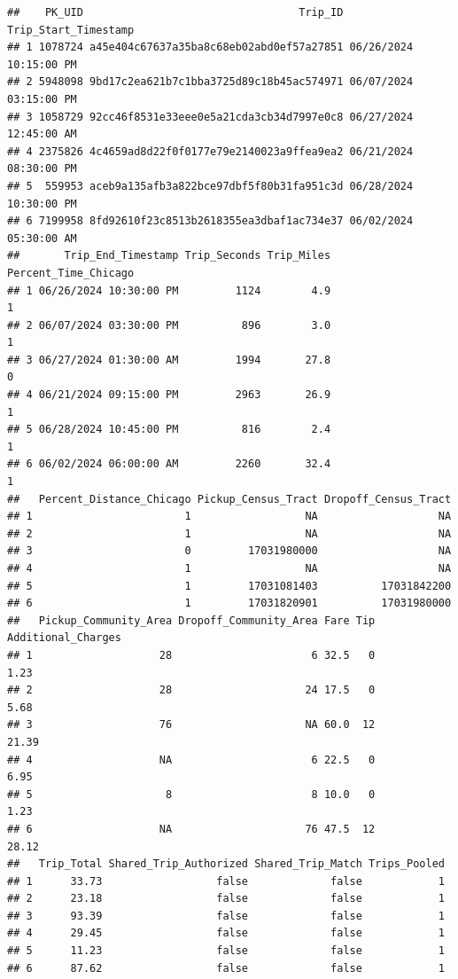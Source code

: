 \documentclass[
]{article}
\begin{document}
\begin{verbatim}
##    PK_UID                                  Trip_ID   Trip_Start_Timestamp
## 1 1078724 a45e404c67637a35ba8c68eb02abd0ef57a27851 06/26/2024 10:15:00 PM
## 2 5948098 9bd17c2ea621b7c1bba3725d89c18b45ac574971 06/07/2024 03:15:00 PM
## 3 1058729 92cc46f8531e33eee0e5a21cda3cb34d7997e0c8 06/27/2024 12:45:00 AM
## 4 2375826 4c4659ad8d22f0f0177e79e2140023a9ffea9ea2 06/21/2024 08:30:00 PM
## 5  559953 aceb9a135afb3a822bce97dbf5f80b31fa951c3d 06/28/2024 10:30:00 PM
## 6 7199958 8fd92610f23c8513b2618355ea3dbaf1ac734e37 06/02/2024 05:30:00 AM
##       Trip_End_Timestamp Trip_Seconds Trip_Miles Percent_Time_Chicago
## 1 06/26/2024 10:30:00 PM         1124        4.9                    1
## 2 06/07/2024 03:30:00 PM          896        3.0                    1
## 3 06/27/2024 01:30:00 AM         1994       27.8                    0
## 4 06/21/2024 09:15:00 PM         2963       26.9                    1
## 5 06/28/2024 10:45:00 PM          816        2.4                    1
## 6 06/02/2024 06:00:00 AM         2260       32.4                    1
##   Percent_Distance_Chicago Pickup_Census_Tract Dropoff_Census_Tract
## 1                        1                  NA                   NA
## 2                        1                  NA                   NA
## 3                        0         17031980000                   NA
## 4                        1                  NA                   NA
## 5                        1         17031081403          17031842200
## 6                        1         17031820901          17031980000
##   Pickup_Community_Area Dropoff_Community_Area Fare Tip Additional_Charges
## 1                    28                      6 32.5   0               1.23
## 2                    28                     24 17.5   0               5.68
## 3                    76                     NA 60.0  12              21.39
## 4                    NA                      6 22.5   0               6.95
## 5                     8                      8 10.0   0               1.23
## 6                    NA                     76 47.5  12              28.12
##   Trip_Total Shared_Trip_Authorized Shared_Trip_Match Trips_Pooled
## 1      33.73                  false             false            1
## 2      23.18                  false             false            1
## 3      93.39                  false             false            1
## 4      29.45                  false             false            1
## 5      11.23                  false             false            1
## 6      87.62                  false             false            1

\end{verbatim}
\end{document}

